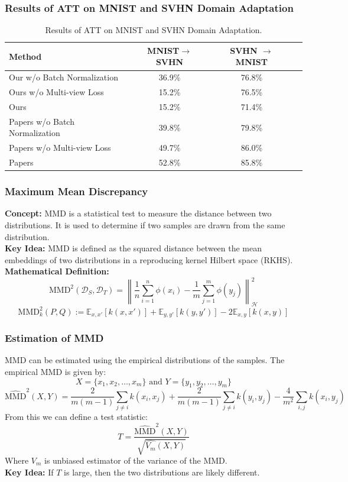 \documentclass{beamer}
\begin{document}
\begin{frame}
    \frametitle{Results of ATT on MNIST and SVHN Domain Adaptation}

    \begin{table}[h]
        \centering
        \caption{Results of ATT on MNIST and SVHN Domain Adaptation.}
        \label{tab:att_results}
        \begin{tabular}{lccc}
            \toprule
            \textbf{Method} & \textbf{MNIST\(\to\)SVHN} & \textbf{SVHN \(\to\) MNIST} \\
            \midrule
            Our w/o Batch Normalization & 36.9\% & 76.8\% \\
            Ours w/o Multi-view Loss & 15.2\% & 76.5\% \\
            Ours  & 15.2\% & 71.4\% \\
            \midrule
            Papers w/o Batch Normalization & 39.8\% & 79.8\% \\
            Papers w/o Multi-view Loss & 49.7\% & 86.0\% \\
            Papers  & 52.8\% & 85.8\% \\
            \bottomrule
        \end{tabular}
      \end{table}
\end{frame}


\begin{frame}
    \frametitle{Maximum Mean Discrepancy}
    \textbf{Concept:} MMD is a statistical test to measure the distance between two distributions. It is used to determine if two samples are drawn from the same distribution.\\
    \textbf{Key Idea:} MMD is defined as the squared distance between the mean embeddings of two distributions in a reproducing kernel Hilbert space (RKHS).\\
    \textbf{Mathematical Definition:}
    \[
        \text{MMD}^2(\mathcal{D}_S, \mathcal{D}_T) = \left\| \frac{1}{n} \sum_{i=1}^{n} \phi(x_i) - \frac{1}{m} \sum_{j=1}^{m} \phi(y_j) \right\|_{\mathcal{H}}^2
    \]
    \[
        \text{MMD}^2_k(P,Q) := \mathbb{E}_{x,x'}[k(x,x')] + \mathbb{E}_{y,y'}[k(y,y')] - 2\mathbb{E}_{x,y}[k(x,y)]
    \]   
\end{frame}

\begin{frame}
    \frametitle{Estimation of MMD}
    MMD can be estimated using the empirical distributions of the samples. The empirical MMD is given by:
    \[
         X = \{x_1, x_2, \ldots, x_m\} \text{ and } Y = \{y_1, y_2, \ldots, y_m\}
    \]
    \small \[
        \hat{\text{MMD}}^2(X,Y) = \frac{2}{m(m-1)} \sum_{j \neq i} k(x_i,x_j) + \frac{2}{m(m-1)} \sum_{j \neq i} k(y_i,y_j) - \frac{4}{m^2} \sum_{i,j} k(x_i,y_j)
    \]
    From this we can define a test statistic:
    \[
        T = \frac{\hat{\text{MMD}}^2(X,Y)}{\sqrt{\hat{V_m}(X,Y)}}
    \]
    Where \(V_m\) is unbiased estimator of the variance of the MMD.\\
    \textbf{Key Idea:} If \(T\) is large, then the two distributions are likely different.\\

\end{frame}
\end{document}
